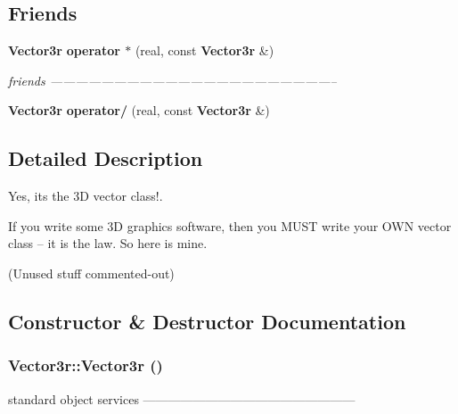 \subsection*{Friends}
\begin{CompactItemize}
\item 
{\bf Vector3r} {\bf operator $\ast$} (real, const {\bf Vector3r} \&)
\begin{CompactList}\small\item\em friends -------------------------------------------------------------------- \item\end{CompactList}\item 
{\bf Vector3r} {\bf operator/} (real, const {\bf Vector3r} \&)
\end{CompactItemize}


\subsection{Detailed Description}
Yes, its the 3D vector class!.\par
\par


If you write some 3D graphics software, then you MUST write your OWN vector class -- it is the law. So here is mine.\par
\par


(Unused stuff commented-out) 



\subsection{Constructor \& Destructor Documentation}
\subsubsection{\setlength{\rightskip}{0pt plus 5cm}Vector3r::Vector3r ()}\label{classhxa7241__graphics_1_1Vector3r_6cafbec0341bf75076ed59bf0d63acbb}


standard object services --------------------------------------------------- 

